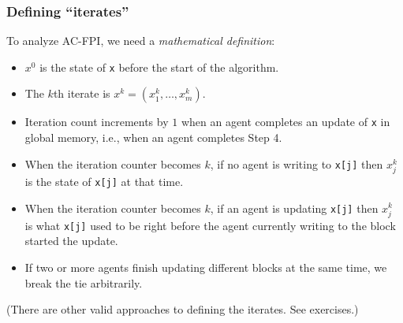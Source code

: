 \documentclass[10pt,mathserif]{beamer}
\begin{document}
\begin{frame}
\frametitle{Defining ``iterates''}

To analyze AC-FPI, we need a \emph{mathematical definition}:
\begin{itemize}
\item
$x^0$ is the state of \verb|x| before the start of the algorithm.
\item 
The $k$th iterate is $x^k=(x_1^k,\dots,x_m^k)$.
\item 
Iteration count increments by $1$ when an agent completes an update of \verb|x| in global memory, i.e., when an agent completes Step 4.
\item 
When the iteration counter becomes $k$, if no agent is writing to \verb|x[j]| then $x_j^k$ is the state of \verb|x[j]| at that time.
\item 
When the iteration counter becomes $k$, if an agent is updating \verb|x[j]| then $x_j^k$ is what \verb|x[j]| used to be right before the agent currently writing to the block started the update.
\item
If two or more agents finish updating different blocks at the same time, we break the tie arbitrarily.
\end{itemize}
\vspace{0.1in}


(There are other valid approaches to defining the iterates. See exercises.)

\vspace{0.1in}



\end{frame}
\end{document}
